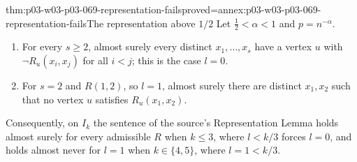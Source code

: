 \begin{hbcorollary}{thm:p03-w03-p03-069-representation-fails}{proved=annex:p03-w03-p03-069-representation-fails}{The representation above \(1/2\)}
Let \(\tfrac12<\alpha<1\) and \(p=n^{-\alpha}\).
\begin{enumerate}
\item For every \(s\geq2\), almost surely every distinct
\(x_1,\ldots,x_s\) have a vertex \(u\) with \(\neg R_u(x_i,x_j)\) for all
\(i<j\); this is the case \(l=0\).
\item For \(s=2\) and \(R(1,2)\), so \(l=1\), almost surely there are
distinct \(x_1,x_2\) such that no vertex \(u\) satisfies \(R_u(x_1,x_2)\).
\end{enumerate}
Consequently, on \(I_k\) the sentence of the source's Representation Lemma
holds almost surely for every admissible \(R\) when \(k\leq3\), where
\(l<k/3\) forces \(l=0\), and holds almost never for \(l=1\) when
\(k\in\{4,5\}\), where \(l=1<k/3\).
\end{hbcorollary}

